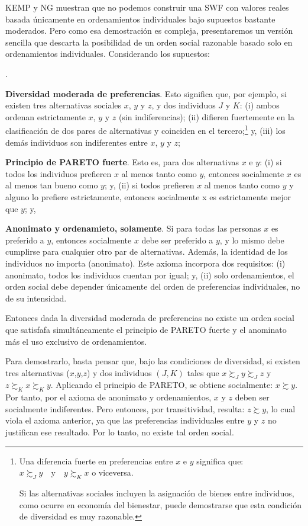 \documentclass[10pt,a4paper]{article}
\newcounter{numitem}
\newenvironment{lnum}
      {\begin{list}{\arabic{numitem}.}{%
          \usecounter{numitem}%
          \setlength{\leftmargin}{1cm}%
          \setlength{\parskip}{3pt}%
          \setlength{\itemsep}{0pt}%
          \setlength{\parsep}{0pt}%
      }}
      {\end{list}}
\begin{document}
KEMP y NG muestran que no podemos construir una SWF con valores reales basada únicamente en ordenamientos individuales bajo supuestos bastante moderados. Pero como esa demostración es compleja, presentaremos un versión sencilla que descarta la posibilidad de un orden social razonable basado solo en ordenamientos individuales. Considerando los supuestos:
\begin{lnum}
    \item \textbf{Diversidad moderada de preferencias}. Esto significa que, por ejemplo, si existen tres alternativas sociales $x$, $y$ y $z$, y dos individuos $J$ y $K$: (i) ambos ordenan estrictamente $x$, $y$ y $z$ (sin indiferencias); (ii) difieren fuertemente en la clasificación de dos pares de alternativas y coinciden en el tercero;\footnote{%
        Una diferencia fuerte en preferencias entre $x$ e $y$ significa que: $x\succsim_Jy \quad \text{y} \quad y\succsim_K x$ o viceversa. 
    
    Si las alternativas sociales incluyen la asignación de bienes entre individuos, como ocurre en economía del bienestar, puede demostrarse que esta condición de diversidad es muy razonable.
    } y, (iii) los demás individuos son indiferentes entre $x$, $y$ y $z$;
    \item \textbf{Principio de PARETO fuerte}. Esto es, para dos alternativas $x$ e $y$: (i) si todos los individuos prefieren $x$ al menos tanto como $y$, entonces socialmente $x$ es al menos tan bueno como $y$; y, (ii) si todos prefieren $x$ al menos tanto como $y$ y alguno lo prefiere estrictamente, entonces socialmente x es estrictamente mejor que $y$; y,
    \item \textbf{Anonimato y ordenamieto, solamente}. Si para todas las personas $x$ es preferido a $y$, entonces socialmente $x$ debe ser preferido a $y$, y lo mismo debe cumplirse para cualquier otro par de alternativas. Además, la identidad de los individuos no importa (anonimato). Este axioma incorpora dos requisitos: (i) anonimato, todos los individuos cuentan por igual; y, (ii) solo ordenamientos, el orden social debe depender únicamente del orden de preferencias individuales, no de su intensidad.
\end{lnum}

Entonces dada la diversidad moderada de preferencias no existe un orden social que satisfafa simultáneamente el principio de PARETO fuerte y el anominato más el uso exclusivo de ordenamientos.

Para demostrarlo, basta pensar que, bajo las condiciones de diversidad, si existen tres alternativas ($x$,$y$,$z$) y dos individuos $(J,K)$ tales que $x\succsim_Jy\succsim_Jz$ y $z\succsim_Kx\succsim_Ky$. Aplicando el principio de PARETO, se obtiene socialmente: $x\succsim y$. Por tanto, por el axioma de anonimato y ordenamientos, $x$ y $z$ deben ser socialmente indiferentes. Pero entonces, por transitividad, resulta: $z\succsim y$, lo cual viola el axioma anterior, ya que las preferencias individuales entre $y$ y $z$ no justifican ese resultado. Por lo tanto, no existe tal orden social.
\end{document}
